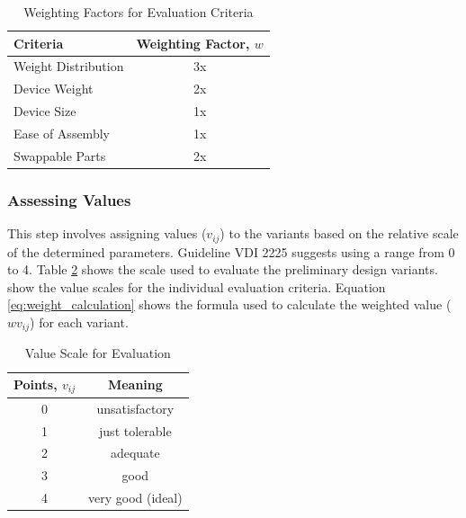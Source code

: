 \begin{table}[!ht]
    \centering
    \begin{tabular}{|l|c|}
        \hline
        \textbf{Criteria}   & \textbf{Weighting Factor, $w$} \\ \hline
        Weight Distribution & 3x                             \\ \hline
        Device Weight       & 2x                             \\ \hline
        Device Size         & 1x                             \\ \hline
        Ease of Assembly    & 1x                             \\ \hline
        Swappable Parts     & 2x                             \\ \hline
    \end{tabular}
    \caption{Weighting Factors for Evaluation Criteria}
    \label{tab:weighting}
\end{table}

\subsubsection{Assessing Values}
This step involves assigning values ($v_{ij}$) to the variants based on the relative scale of the determined parameters. Guideline VDI 2225 suggests using a range from 0 to 4. Table \ref{tab:value_scale} shows the scale used to evaluate the preliminary design variants.  show the value scales for the individual evaluation criteria. Equation \ref{eq:weight_calculation} shows the formula used to calculate the weighted value ($wv_{ij}$) for each variant.

\begin{table}[!ht]
    \centering
    \begin{tabular}{|c|c|}
        \hline
        \textbf{Points, $v_{ij}$} & \textbf{Meaning}  \\ \hline
        0                         & unsatisfactory    \\ \hline
        1                         & just tolerable    \\ \hline
        2                         & adequate          \\ \hline
        3                         & good              \\ \hline
        4                         & very good (ideal) \\ \hline
    \end{tabular}
    \caption{Value Scale for Evaluation \cite[115]{Pahl2007}}
    \label{tab:value_scale}
\end{table}

